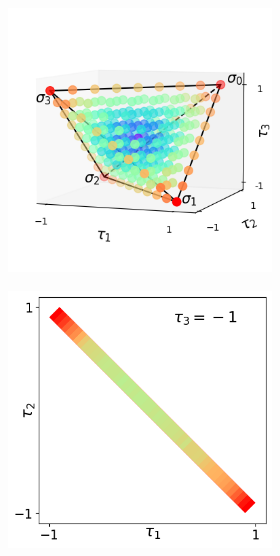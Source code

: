 \documentclass[12pt]{standalone}
\begin{document}
\pagestyle{empty}

\begin{figure} %
\begin{subfigure}{0.9\textwidth}
\begin{subfigure}{.666\textwidth}
\includegraphics[width=.95\columnwidth]{tetra-def.png}
\end{subfigure}%
\begin{subfigure}{.333\textwidth}
\includegraphics[width=.95\columnwidth]{corte1-2.png} \\

\end{subfigure}
\end{subfigure}
\end{figure}
\end{document}
